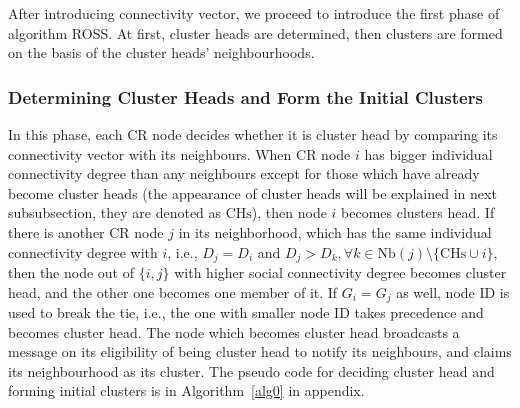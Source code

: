 \documentclass[10pt,journal,compsoc]{IEEEtran}
\theoremstyle{mytheoremstyle}
\theoremstyle{mytheoremstyle}
\theoremstyle{mytheoremstyle}
\newcommand{\ie}{i.e., }
\begin{document}
After introducing connectivity vector, we proceed to introduce the first phase of algorithm ROSS.
At first, cluster heads are determined, then clusters are formed on the basis of the cluster heads' neighbourhoods.


\subsubsection{Determining Cluster Heads and Form the Initial Clusters}
In this phase, each CR node decides whether it is cluster head by comparing its connectivity vector with its neighbours.
When CR node $i$ has bigger individual connectivity degree than any neighbours except for those which have already become cluster heads (the appearance of cluster heads will be explained in next subsubsection, they are denoted as $\text{CHs}$), then node $i$ becomes clusters head.
If there is another CR node $j$ in its neighborhood, which has the same individual connectivity degree with $i$, \ie $D_j = D_i$ and $D_j > D_{k}, \forall k\in \text{Nb}(j)\setminus \{\text{CHs}\cup i\}$, then the node out of $\{i, j\}$ with higher social connectivity degree becomes cluster head, and the other one becomes one member of it. 
If $G_i = G_j$ as well, node ID is used to break the tie, \ie the one with smaller node ID takes precedence and becomes cluster head.
%
The node which becomes cluster head broadcasts a message on its eligibility of being cluster head to notify its neighbours, and claims its neighbourhood as its cluster.
The pseudo code for deciding cluster head and forming initial clusters is in Algorithm~\ref{alg0} in appendix.
\end{document}
